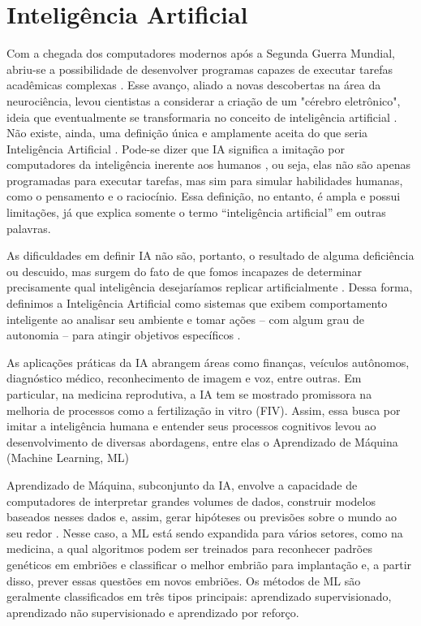 \section{Inteligência Artificial}

Com a chegada dos computadores modernos após a Segunda Guerra Mundial, abriu-se a possibilidade de desenvolver programas capazes de executar tarefas acadêmicas complexas \cite{jeffery2022}. Esse avanço, aliado a novas descobertas na área da neurociência, levou cientistas a considerar a criação de um "cérebro eletrônico", ideia que eventualmente se transformaria no conceito de inteligência artificial \cite{jeffery2022}. Não existe, ainda, uma definição  única e amplamente aceita do que seria Inteligência Artificial \cite{sheikh2023}. Pode-se dizer que IA significa a imitação por computadores da inteligência inerente aos humanos \cite{sheikh2023}, ou seja, elas não são apenas programadas para executar tarefas, mas sim para simular habilidades humanas, como o pensamento e o raciocínio. Essa definição, no entanto, é ampla e possui limitações, já que explica somente o termo “inteligência artificial” em outras palavras. 

As dificuldades em definir IA não são, portanto, o resultado de alguma deficiência ou descuido, mas surgem do fato de que fomos incapazes de determinar precisamente qual inteligência desejaríamos replicar artificialmente \cite{sheikh2023}. Dessa forma, definimos a Inteligência Artificial como sistemas que exibem comportamento inteligente ao analisar seu ambiente e tomar ações – com algum grau de autonomia – para atingir objetivos específicos \cite{sheikh2023}.

As aplicações práticas da IA abrangem áreas como finanças, veículos autônomos, diagnóstico médico, reconhecimento de imagem e voz, entre outras. Em particular, na medicina reprodutiva, a IA tem se mostrado promissora na melhoria de processos como a fertilização in vitro (FIV). Assim, essa busca por imitar a inteligência humana e entender seus processos cognitivos levou ao desenvolvimento de diversas abordagens, entre elas o Aprendizado de Máquina (Machine Learning, ML)

Aprendizado de Máquina, subconjunto da IA,  envolve a capacidade de computadores de interpretar grandes volumes de dados, construir modelos baseados nesses dados e, assim, gerar hipóteses ou previsões sobre o mundo ao seu redor \cite{russell2016}. Nesse caso, a ML está sendo expandida para vários setores, como na medicina, a qual algoritmos podem ser treinados para reconhecer padrões genéticos em embriões e classificar o melhor embrião para implantação e, a partir disso, prever essas questões em novos embriões. Os métodos de ML são geralmente classificados em três tipos principais: aprendizado supervisionado, aprendizado não supervisionado e aprendizado por reforço.


